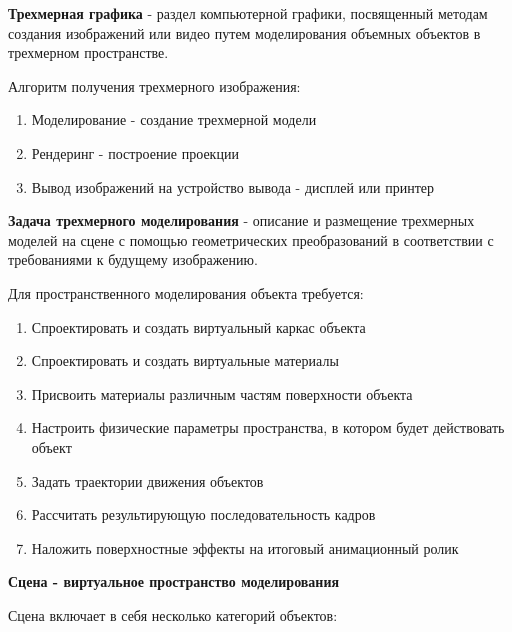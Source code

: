 \documentclass{article}
\begin{document}
\begin{flushleft}

\textbf{Трехмерная графика} - раздел компьютерной графики, посвященный методам создания изображений или видео путем моделирования объемных объектов в трехмерном пространстве.

\hfill

Алгоритм получения трехмерного изображения:

\begin{enumerate}
    \item Моделирование - создание трехмерной модели
    \item Рендеринг - построение проекции
    \item Вывод изображений на устройство вывода - дисплей или принтер
\end{enumerate}

\textbf{Задача трехмерного моделирования} - описание и размещение трехмерных моделей на сцене с помощью геометрических преобразований в соответствии с требованиями к будущему изображению.

\hfill

Для пространственного моделирования объекта требуется:

\begin{enumerate}
    \item Спроектировать и создать виртуальный каркас объекта
    \item Спроектировать и создать виртуальные материалы
    \item Присвоить материалы различным частям поверхности объекта
    \item Настроить физические параметры пространства, в котором будет действовать объект
    \item Задать траектории движения объектов
    \item Рассчитать результирующую последовательность кадров
    \item Наложить поверхностные эффекты на итоговый анимационный ролик
\end{enumerate}

\textbf{Сцена - виртуальное пространство моделирования}

Сцена включает в себя несколько категорий объектов:

\begin{multienumerate}
\end{multienumerate}


\end{flushleft}
\end{document}
